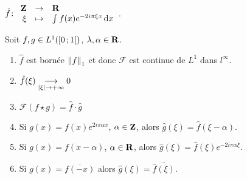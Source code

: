 \begin{defn}
	$\hat{f} \colon \begin{array}{rcl}
		\mathbf{Z} & \to & \mathbf{R} \\
		\xi & \mapsto & \int f(x) e^{-2i\pi \xi x} \mathop{}\mathopen{}\mathrm{d} x
	\end{array}$.
\end{defn}

\begin{pop}
	Soit $f,g \in L^1 (\mathopen{}\mathclose{\left[0\mathclose{}\mathpunct{};1\right[})$, $\lambda, \alpha \in \mathbf{R}$.
	\begin{enumerate}
		\item $\hat{f}$ est bornée $\left\lVert f\right\rVert_1$ et donc $\mathcal{F}$ est continue de $L^1$ dans $l^\infty$.
		\item $\hat{f}(\xi) \underset{\left\lvert\xi\right\rvert \to +\infty}{\longrightarrow} 0$
		\item $\mathcal{F} (f \star g) = \hat{f} \cdot \hat{g}$
		\item Si $g(x) = f(x) e^{2i\pi \alpha x}$, $\alpha \in \mathbf{Z}$, alors $\hat{g}(\xi) = \hat{f}(\xi - \alpha)$.
		\item Si $g(x) = f(x - \alpha)$, $\alpha \in \mathbf{R}$, alors $\hat{g}(\xi) = \hat{f}(\xi) e^{-2i\pi \alpha \xi}$.
		\item Si $g(x) = \overline{f(-x)}$ alors $\hat{g}(\xi) = \overline{\hat{f}(\xi)}$.
	\end{enumerate}
\end{pop}

